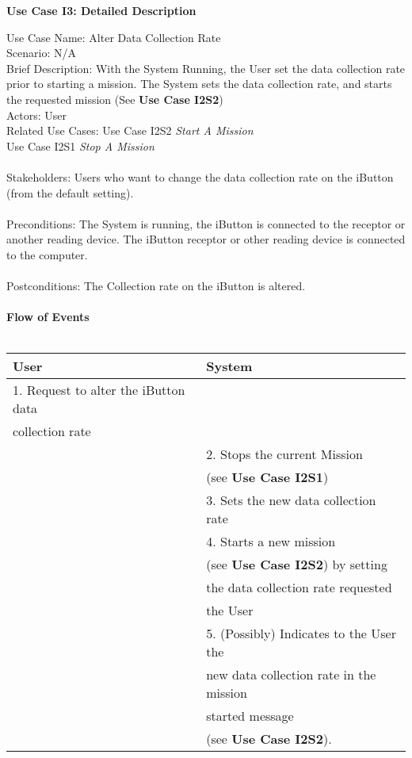 \documentclass[letterpaper]{article}
\begin{document}
\noindent
\begin{center}
\textbf{Use Case I3:  Detailed Description}
\end{center}
Use Case Name:  Alter Data Collection Rate\\
Scenario:  N/A\\
Brief Description:  With the System Running, the User set the data
collection rate prior to starting a mission.  The System sets the
data collection rate, and starts the requested mission (See
\textbf{Use Case I2S2})\\
Actors:  User\\
Related Use Cases: Use Case I2S2 \textit{Start A Mission}\\
Use Case I2S1 \textit{Stop A Mission}\\\\
Stakeholders:  Users who want to change the data collection rate on
the iButton (from the default setting).\\\\
Preconditions:  The System is running, the iButton is connected to
the receptor or another reading device.  The iButton receptor or
other reading device is connected to the computer.\\\\
Postconditions:  The Collection rate on the iButton is altered.\\\\
\textbf{Flow of Events}\\\\
\begin{tabular}{|l|l|}\hline
\textbf{User} & \textbf{System}\\\hline
1.  Request to alter the iButton data & \\
collection rate & \\\hline
& 2.  Stops the current Mission\\
& (see \textbf{Use Case I2S1})\\\hline
& 3.  Sets the new data collection rate\\\hline
& 4.  Starts a new mission \\
& (see \textbf{Use Case I2S2}) by setting\\
& the data collection rate requested\\
& the User\\\hline
& 5.  (Possibly) Indicates to the User the \\
& new data collection rate in the mission\\
& started message \\
& (see \textbf{Use Case I2S2}).\\\hline
\end{tabular}\\\\
\end{document}
